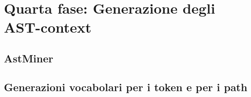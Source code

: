 \section{Quarta fase: Generazione degli AST-context}

\subsection{AstMiner}

\subsection{Generazioni vocabolari per i token e per i path}










